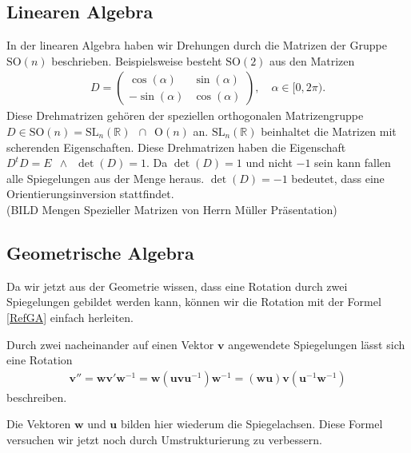 \subsection{Linearen Algebra}
In der linearen Algebra haben wir Drehungen durch die Matrizen der Gruppe $\text{SO}(n)$ beschrieben. Beispielsweise besteht $\text{SO}(2)$  aus den Matrizen
\begin{align}
	D = 
	\begin{pmatrix}
		\cos(\alpha) & \sin(\alpha) \\
		-\sin(\alpha) & \cos(\alpha) 
	\end{pmatrix},\quad
	\alpha \in [0, 2\pi).
\end{align}
Diese Drehmatrizen gehören der speziellen orthogonalen Matrizengruppe $D\in \text{SO}(n) = \text{SL}_n(\mathbb{R})\enspace \cap \enspace \text{O}(n)$ an. $\text{SL}_n(\mathbb{R})$ beinhaltet die Matrizen mit scherenden Eigenschaften. Diese Drehmatrizen haben die Eigenschaft $D^t D = E \enspace \land \enspace \det(D)=1$. Da $\det(D) = 1$ und nicht $-1$ sein kann fallen alle Spiegelungen aus der Menge heraus. $\det(D) = -1$ bedeutet, dass eine Orientierungsinversion stattfindet.  
\\(BILD Mengen Spezieller Matrizen von Herrn Müller Präsentation)

\subsection{Geometrische Algebra}
Da wir jetzt aus der Geometrie wissen, dass eine Rotation durch zwei Spiegelungen gebildet werden kann, können wir die Rotation mit der Formel \eqref{RefGA} einfach herleiten.
\begin{satz}
	Durch zwei nacheinander auf einen Vektor $\mathbf{v}$ angewendete Spiegelungen lässt sich eine Rotation 
	\begin{align} \label{rotGA}
		\mathbf{v}'' = \mathbf{wv}'\mathbf{w}^{-1} = \mathbf{w}(\mathbf{uvu}^{-1})\mathbf{w}^{-1} = (\mathbf{wu})\mathbf{v}(\mathbf{u}^{-1}\mathbf{w}^{-1})
	\end{align}
	beschreiben.
\end{satz}
Die Vektoren $\mathbf{w}$ und $\mathbf{u}$ bilden hier wiederum die Spiegelachsen. Diese Formel versuchen wir jetzt noch durch Umstrukturierung zu verbessern. 
